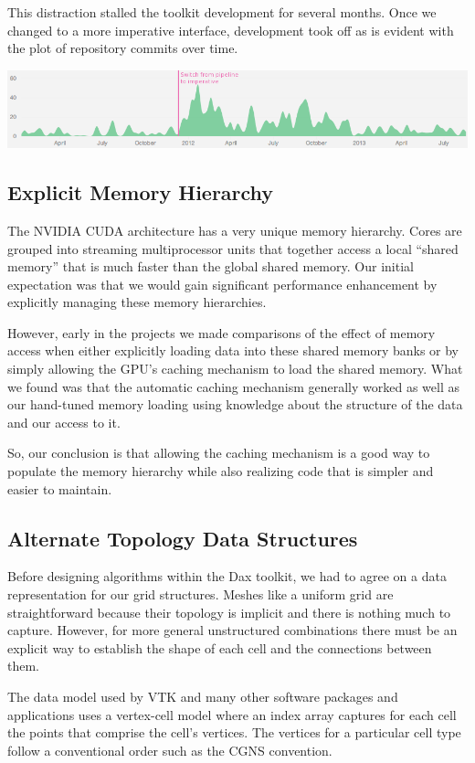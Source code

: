 This distraction stalled the toolkit development for several months. Once
we changed to a more imperative interface, development took off as is
evident with the plot of repository commits over time.

\noindent
\includegraphics[width=\textwidth]{images/GitActivity}

\subsection{Explicit Memory Hierarchy}

The NVIDIA CUDA architecture has a very unique memory hierarchy. Cores are
grouped into streaming multiprocessor units that together access a local
``shared memory'' that is much faster than the global shared memory. Our
initial expectation was that we would gain significant performance
enhancement by explicitly managing these memory hierarchies.

However, early in the projects we made comparisons of the effect of memory
access when either explicitly loading data into these shared memory banks
or by simply allowing the GPU's caching mechanism to load the shared
memory. What we found was that the automatic caching mechanism generally
worked as well as our hand-tuned memory loading using knowledge about the
structure of the data and our access to it.

So, our conclusion is that allowing the caching mechanism is a good way to
populate the memory hierarchy while also realizing code that is simpler and
easier to maintain.

\subsection{Alternate Topology Data Structures}

Before designing algorithms within the Dax toolkit, we had to agree on a
data representation for our grid structures. Meshes like a uniform grid are
straightforward because their topology is implicit and there is nothing
much to capture. However, for more general unstructured combinations there
must be an explicit way to establish the shape of each cell and the
connections between them.

The data model used by VTK and many other software packages and
applications uses a vertex-cell model where an index array captures for
each cell the points that comprise the cell's vertices. The vertices for a
particular cell type follow a conventional order such as the CGNS
convention.

